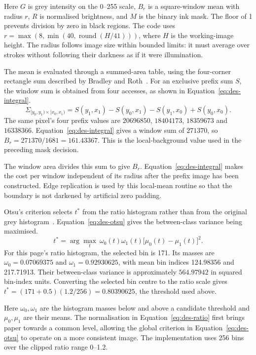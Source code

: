 Here $G$ is grey intensity on the 0--255 scale, $B_r$ is a square-window mean with radius $r$, $R$ is normalised brightness, and $M$ is the binary ink mask. The floor of 1 prevents division by zero in black regions. The code uses $r=\max(8,\min(40,\operatorname{round}(H/41)))$, where $H$ is the working-image height. The radius follows image size within bounded limits: it must average over strokes without following their darkness as if it were illumination.

The mean is evaluated through a summed-area table, using the four-corner rectangle sum described by Bradley and Roth~\cite[PDF p.~2, Eq.~(2)]{bradley2007}. For an exclusive prefix sum $S$, the window sum is obtained from four accesses, as shown in Equation~\ref{eq:des-integral}.
\begin{equation}
\Sigma_{[y_0,y_1)\times[x_0,x_1)}=
S(y_1,x_1)-S(y_0,x_1)-S(y_1,x_0)+S(y_0,x_0).
\label{eq:des-integral}
\end{equation}
The same pixel's four prefix values are $20696850$, $18404173$, $18359673$ and $16338366$. Equation~\ref{eq:des-integral} gives a window sum of $271370$, so $B_r=271370/1681=161.43367$. This is the local-background value used in the preceding mask decision.

The window area divides this sum to give $B_r$. Equation~\ref{eq:des-integral} makes the cost per window independent of its radius after the prefix image has been constructed. Edge replication is used by this local-mean routine so that the boundary is not darkened by artificial zero padding.

Otsu's criterion selects $t^*$ from the ratio histogram rather than from the original grey histogram~\cite[page to verify]{otsu1979}. Equation~\ref{eq:des-otsu} gives the between-class variance being maximised.
\begin{equation}
t^*=\arg\max_t\ \omega_0(t)\omega_1(t)
\bigl[\mu_0(t)-\mu_1(t)\bigr]^2.
\label{eq:des-otsu}
\end{equation}
For this page's ratio histogram, the selected bin is 171. Its masses are $\omega_0=0.07069375$ and $\omega_1=0.92930625$, with mean bin indices 124.98356 and 217.71913. Their between-class variance is approximately $564.97942$ in squared bin-index units. Converting the selected bin centre to the ratio scale gives $t^*=(171+0.5)(1.2/256)=0.80390625$, the threshold used above.

Here $\omega_0,\omega_1$ are the histogram masses below and above a candidate threshold and $\mu_0,\mu_1$ are their means. The normalisation in Equation~\ref{eq:des-ratio} first brings paper towards a common level, allowing the global criterion in Equation~\ref{eq:des-otsu} to operate on a more consistent image. The implementation uses 256 bins over the clipped ratio range 0--1.2.


